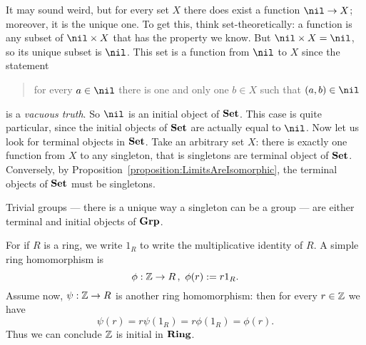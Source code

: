 \begin{example}
  It may sound weird, but for every set \(X\) there does exist a
  function \(\nil \to X\); moreover, it is the unique one. To get this,
  think set-theoretically: a function is any subset of
  \(\nil \times X\) that has the property we know. But
  \(\nil \times X = \nil\), so its unique subset is \(\nil\). This set is a
  function from \(\nil\) to \(X\) since the statement
  \begin{quotation}
    for every \(a \in \nil\) there is one and only one \(b \in X\) such
    that \((a, b) \in \nil\)
  \end{quotation}
  is a {\em vacuous truth}.
  So \(\nil\) is an initial object of \(\mathbf{Set}\). This case is quite
  particular, since the initial objects of \(\mathbf{Set}\) are actually equal
  to \(\nil\). \newline Now let us look for terminal objects in
  \(\mathbf{Set}\). Take an arbitrary set \(X\): there is exactly one function
  from \(X\) to any singleton, that is singletons are terminal object
  of \(\mathbf{Set}\). Conversely, by
  Proposition~\ref{proposition:LimitsAreIsomorphic}, the terminal
  objects of \(\mathbf{Set}\) must be singletons.
\end{example}

\begin{exercise}
  Trivial groups --- there is a unique way a singleton can be a group ---
  are either terminal and initial objects of \(\mathbf{Grp}\).
\end{exercise}

\begin{example}
  For if \(R\) is a ring, we write \(1_R\) to write the multiplicative
  identity of \(R\). A simple ring homomorphism is
  \[\phi : \mathbb Z \to R \,,\ \phi(r) := r 1_R .\]
  Assume now, \(\psi : \mathbb Z \to R\) is another ring homomorphism: then
  for every \(r \in \mathbb Z\) we have
  \[\psi(r) = r \psi\left(1_R\right) = r \phi\left(1_R\right) = \phi(r) .\]
  Thus we can conclude \(\mathbb Z\) is initial in \(\mathbf{Ring}\).
\end{example}

